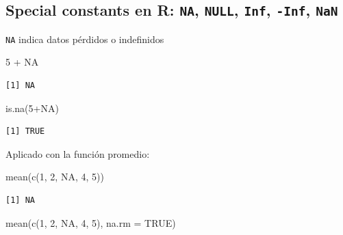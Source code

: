 \documentclass[
  letterpaper,
  DIV=11,
  numbers=noendperiod]{scrartcl}
\newenvironment{Shaded}{\begin{snugshade}}{\end{snugshade}}
\newcommand{\AttributeTok}[1]{\textcolor[rgb]{0.40,0.45,0.13}{#1}}
\newcommand{\ConstantTok}[1]{\textcolor[rgb]{0.56,0.35,0.01}{#1}}
\newcommand{\DecValTok}[1]{\textcolor[rgb]{0.68,0.00,0.00}{#1}}
\newcommand{\FunctionTok}[1]{\textcolor[rgb]{0.28,0.35,0.67}{#1}}
\newcommand{\NormalTok}[1]{\textcolor[rgb]{0.00,0.23,0.31}{#1}}
\newcommand{\SpecialCharTok}[1]{\textcolor[rgb]{0.37,0.37,0.37}{#1}}
\begin{document}
\subsection{\texorpdfstring{Special constants en R: \texttt{NA},
\texttt{NULL}, \texttt{Inf}, \texttt{-Inf},
\texttt{NaN}}{Special constants en R: NA, NULL, Inf, -Inf, NaN}}\label{special-constants-en-r-na-null-inf--inf-nan}

\texttt{NA} indica datos pérdidos o indefinidos

\begin{Shaded}
\begin{Highlighting}[]
\DecValTok{5} \SpecialCharTok{+} \ConstantTok{NA}      
\end{Highlighting}
\end{Shaded}

\begin{verbatim}
[1] NA
\end{verbatim}

\begin{Shaded}
\begin{Highlighting}[]
\FunctionTok{is.na}\NormalTok{(}\DecValTok{5}\SpecialCharTok{+}\ConstantTok{NA}\NormalTok{) }
\end{Highlighting}
\end{Shaded}

\begin{verbatim}
[1] TRUE
\end{verbatim}

Aplicado con la función promedio:

\begin{Shaded}
\begin{Highlighting}[]
\FunctionTok{mean}\NormalTok{(}\FunctionTok{c}\NormalTok{(}\DecValTok{1}\NormalTok{, }\DecValTok{2}\NormalTok{, }\ConstantTok{NA}\NormalTok{, }\DecValTok{4}\NormalTok{, }\DecValTok{5}\NormalTok{)) }
\end{Highlighting}
\end{Shaded}

\begin{verbatim}
[1] NA
\end{verbatim}

\begin{Shaded}
\begin{Highlighting}[]
\FunctionTok{mean}\NormalTok{(}\FunctionTok{c}\NormalTok{(}\DecValTok{1}\NormalTok{, }\DecValTok{2}\NormalTok{, }\ConstantTok{NA}\NormalTok{, }\DecValTok{4}\NormalTok{, }\DecValTok{5}\NormalTok{), }\AttributeTok{na.rm =} \ConstantTok{TRUE}\NormalTok{) }
\end{Highlighting}
\end{Shaded}
\end{document}
